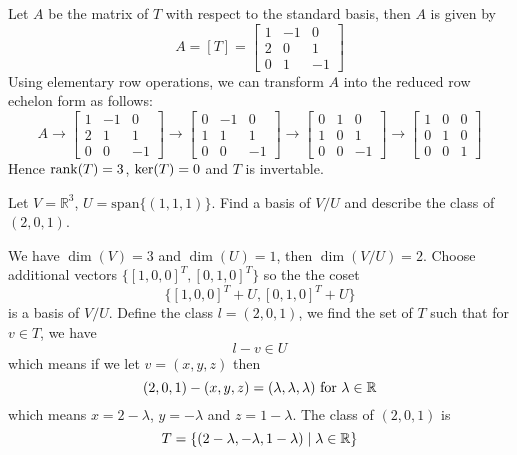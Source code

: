 \documentclass[11pt]{article}
\begin{document}
\begin{sol}
    Let $A$ be the matrix of $T$ with respect to the standard basis, then $A$ is given by
    \[
        A = [T] = \begin{bmatrix}
            1&-1&0\\
            2&0&1\\
            0&1&-1
        \end{bmatrix}
    \]
    Using elementary row operations, we can transform $A$ into the reduced row echelon form as follows: 
    \[
        A \to \begin{bmatrix}
            1&-1&0\\
            2&1&1\\
            0&0&-1
        \end{bmatrix}
        \to 
        \begin{bmatrix}
            0&-1&0\\
            1&1&1\\
            0&0&-1
        \end{bmatrix}
        \to  
        \begin{bmatrix}
            0&1&0\\
            1&0&1\\
            0&0&-1
        \end{bmatrix}
        \to 
        \begin{bmatrix}
            1&0&0\\
            0&1&0\\
            0&0&1
        \end{bmatrix}
    \]
    Hence $\mathrm{rank}(T) = 3$, $\mathrm{ker}(T) = 0$ and $T$ is invertable.
\end{sol}
\begin{problem}
Let $V=\mathbb{R}^3$, $U=\mathrm{span}\{(1,1,1)\}$. Find a basis of $V/U$ and describe the class of $(2,0,1)$.
\end{problem}
\begin{sol}
    We have $\dim(V) = 3$ and $\dim(U) = 1$, then $\dim(V/U) = 2$. Choose additional vectors $\{[1,0,0]^T,[0,1,0]^T\}$ so the the coset 
    \[
        \{[1,0,0]^T + U, [0,1,0]^T + U\} 
    \]
    is a basis of $V/U$. Define the class $l = (2,0,1)$, we find the set of $T$ such that for $v \in T$, we have 
    \[
        l - v \in U
    \]
    which means if we let $v = (x,y,z)$ then 
    \[
        (2,0,1) - (x,y,z) = (\lambda,\lambda,\lambda) \text{ for }\lambda \in \mathbb{R}
    \]
    which means $x = 2 - \lambda$, $y = -\lambda$ and $z = 1 - \lambda$. The class of $(2,0,1)$ is 
    \[
        T = \{(2 - \lambda, -\lambda, 1 - \lambda) \mid \lambda \in \mathbb{R}\}
    \]
\end{sol}
\end{document}
